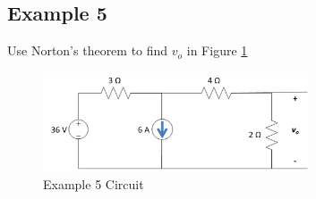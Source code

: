 \documentclass{handout}
\begin{document}
\subsection{Example 5}
Use Norton's theorem to find $v_o$ in Figure \ref{fig: Example5} 
\begin{figure} [h t b]
\centering
\includegraphics[width=0.7\textwidth]{Example5.jpg}
\caption{Example 5 Circuit}
\label{fig: Example5}
\end{figure}


\newpage
\clearpage
\pagebreak
\end{document}
